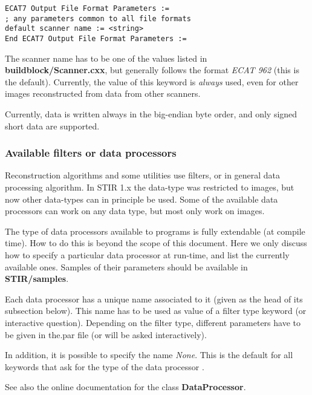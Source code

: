 \documentclass{article}
\begin{document}
\begin{verbatim}
ECAT7 Output File Format Parameters :=
; any parameters common to all file formats
default scanner name := <string>
End ECAT7 Output File Format Parameters :=
\end{verbatim}

The scanner name has to be one of the values listed in \textbf{buildblock/Scanner.cxx}, 
but generally follows the format \textit{ECAT 962} (this is the default). 
Currently, the value of this keyword is \textit{always} used, even 
for other images reconstructed from data from other scanners.


Currently, data is written always in the big-endian byte order, 
and only signed short data are supported.



\subsubsection{
Available filters or data processors}
\label{sec:filters}
Reconstruction algorithms and some utilities use filters, or in 
general data processing algorithm. In STIR 1.x the data-type was restricted
to images, but now other data-types can in principle be used. Some
of the available data processors can work on any data type, but most
only work on images.

The type of data processors 
available to programs is fully extendable (at compile time). 
How to do this is beyond the scope of this document. Here we 
only discuss how to specify a particular data processor at run-time, 
and list the currently available ones. Samples of their parameters 
should be available in \textbf{STIR/samples}.


Each data processor has a unique name associated to it (given 
as the head of its subsection below). This name has to be used 
as value of a filter type keyword (or interactive question). 
Depending on the filter type, different parameters have to be 
given in the.par file (or will be asked interactively).


In addition, it is possible to specify the name \textit{None}. This 
is the default for all keywords that ask for the type of 
the data processor .


See also the online documentation for the class \textbf{DataProcessor}.

{ 
}
\end{document}
